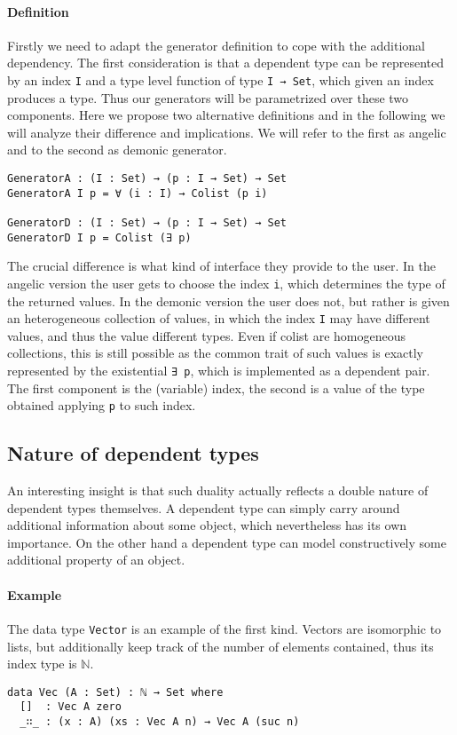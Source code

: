 \documentclass[10pt,a4paper]{article}
\begin{document}
\paragraph{Definition}
Firstly we need to adapt the generator definition to cope with the additional dependency. The first consideration is that a dependent type can be represented by an index \texttt{I} and a type level function of type \texttt{I → Set}, which given an index produces a type. Thus our generators will be parametrized over these two components.
Here we propose two alternative definitions and in the following we will analyze their difference and implications. We will refer to the first as angelic and to the second as demonic generator.
\begin{verbatim}
GeneratorA : (I : Set) → (p : I → Set) → Set
GeneratorA I p = ∀ (i : I) → Colist (p i)

GeneratorD : (I : Set) → (p : I → Set) → Set
GeneratorD I p = Colist (∃ p)
\end{verbatim}
The crucial difference is what kind of interface they provide to the user.
In the angelic version the user gets to choose the index \texttt{i}, which determines the type of the returned values. In the demonic version the user does not, but rather is given an heterogeneous collection of values, in which the index \texttt{I} may have different values, and thus the value different types. Even if colist are homogeneous collections, this is still possible as the common trait of such values is exactly represented by the existential \texttt{∃ p}, which is implemented as a dependent pair. The first component is the (variable) index, the second is a value of the type obtained applying \texttt{p} to such index.

\subsection{Nature of dependent types}
An interesting insight is that such duality actually reflects a double nature of dependent types themselves. 
A dependent type can simply carry around additional information about some object, which nevertheless has its own importance.
On the other hand a dependent type can model constructively some additional property of an object.

\paragraph{Example}
The data type \texttt{Vector} is an example of the first kind.
Vectors are isomorphic to lists, but additionally keep track of the number of elements contained, thus its index type is $\mathbb{N}$.
\begin{verbatim}
data Vec (A : Set) : ℕ → Set where
  []  : Vec A zero
  _∷_ : (x : A) (xs : Vec A n) → Vec A (suc n)
\end{verbatim}
\end{document}

